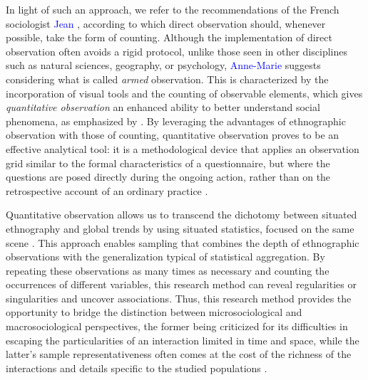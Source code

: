 \begin{refsegment}
In light of such an approach, we refer to the recommendations of the French sociologist \textcolor{blue}{Jean} \textcolor{blue}{\textcite[126]{peneff_mesure_1995}}, according to which direct observation should, whenever possible, take the form of counting. Although the implementation of direct observation often avoids a rigid protocol, unlike those seen in other disciplines such as natural sciences, geography, or psychology, \textcolor{blue}{Anne-Marie} \textcolor{blue}{\textcite[26]{arborio_observation_2007}} suggests considering what is called \textsl{armed} observation. This is characterized by the incorporation of visual tools and the counting of observable elements, which gives \textsl{quantitative observation} an enhanced ability to better understand social phenomena, as emphasized by \textcolor{blue}{\textcite[100]{cochoy_mort_2013}}. By leveraging the advantages of ethnographic observation with those of counting, quantitative observation proves to be an effective analytical tool: it is a methodological device that applies an observation grid similar to the formal characteristics of a questionnaire, but where the questions are posed directly during the ongoing action, rather than on the retrospective account of an ordinary practice \textcolor{blue}{\autocite[100]{cochoy_mort_2013}}.%

Quantitative observation allows us to transcend the dichotomy between situated ethnography and global trends by using situated statistics, focused on the same scene \textcolor{blue}{\autocite[102]{cochoy_mort_2013}}. This approach enables sampling that combines the depth of ethnographic observations with the generalization typical of statistical aggregation. By repeating these observations as many times as necessary and counting the occurrences of different variables, this research method can reveal regularities or singularities and uncover associations. Thus, this research method provides the opportunity to bridge the distinction between microsociological and macrosociological perspectives, the former being criticized for its difficulties in escaping the particularities of an interaction limited in time and space, while the latter's sample representativeness often comes at the cost of the richness of the interactions and details specific to the studied populations \textcolor{blue}{\autocite[102]{cochoy_mort_2013}}.%


\end{refsegment}
